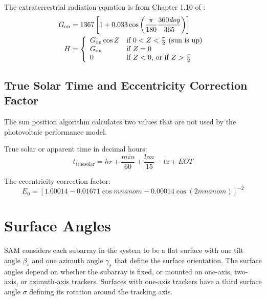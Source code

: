 \documentclass[12pt,letterpaper]{article}
\begin{document}
The extraterrestrial radiation equation is from Chapter 1.10 of \citet{duffie2013}:
\begin{align}\label{eqn-hextra}
G_{\mathrm{on}} &= 1367 \left[1+0.033\cos\left( \frac{\pi}{180}\frac{360\mathit{doy}}{365} \right)\right]\notag\\
H &= \left\{
\begin{array}{ll}
G_{\mathrm{on}} \cos Z & \text{if $0 < Z < \frac{\pi}{2}$ (sun is up)}\\
G_{\mathrm{on}} & \text{if $Z=0$}\\
0 & \text{if $Z<0$, or if $Z>\frac{\pi}{2}$}
\end{array}
\right.
\end{align}

\section{True Solar Time and Eccentricity Correction Factor}

The sun position algorithm calculates two values that are not used by the photovoltaic performance model. 

True solar or apparent time in decimal hours:
\begin{equation}
t_{\mathrm{truesolar}} = \mathit{hr} + \frac{min}{60} + \frac{\mathit{lon}}{15} - \mathit{tz} + \mathit{EOT}
\end{equation}

The eccentricity correction factor:
\begin{equation}
E_0 = [ 1.00014 - 0.01671\cos\mathit{mnanom} - 0.00014\cos(2\mathit{mnanom}) ]^{-2}
\end{equation}

\chapter{Surface Angles}\label{sec-surfaceangles}

SAM considers each subarray in the system to be a flat surface with one tilt angle $\beta_s$ and one azimuth angle $\gamma_s$ that define the surface orientation. The surface angles depend on whether the subarray is fixed, or mounted on one-axis, two-axis, or azimuth-axis trackers. Surfaces with one-axis trackers have a third surface angle $\sigma$ defining its rotation around the tracking axis.
\end{document}
